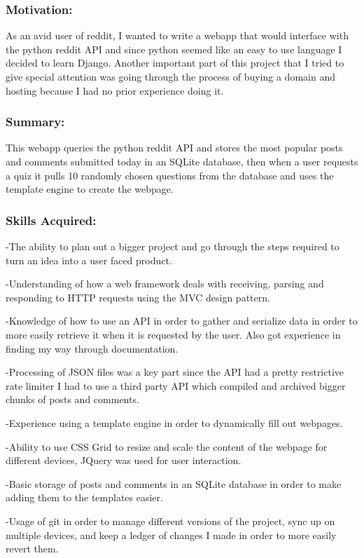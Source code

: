 \documentclass[a4paper,hidelinks,12pt]{article}
\begin{document}
\subsubsection{Motivation:}
As an avid user of reddit, I wanted to write a webapp that would interface with the python reddit API and
since python seemed like an easy to use language I decided to learn Django. Another important part of this
project that I tried to give special attention was going through the process of buying a domain and hosting
because I had no prior experience doing it.

\subsubsection{Summary:}
This webapp queries the python reddit API and stores the most popular posts and comments submitted today 
in an SQLite database, then when a user requests a quiz it pulls 10 randomly chosen questions from the
database and uses the template engine to create the webpage.
\subsubsection{Skills Acquired:}

-The ability to plan out a bigger project and go through the steps required to turn an idea into a user faced
product.

-Understanding of how a web framework deals with receiving, parsing and responding to HTTP requests using
the MVC design pattern.

-Knowledge of how to use an API in order to gather and serialize data in order to more easily retrieve it
when it is requested by the user. Also got experience in finding my way through documentation.

-Processing of JSON files was a key part since the API had a pretty restrictive rate limiter I had to use a
third party API which compiled and archived bigger chunks of posts and comments.

-Experience using a template engine in order to dynamically fill out webpages.

-Ability to use CSS Grid to resize and scale the content of the webpage for different devices, JQuery was used
for user interaction.

-Basic storage of posts and comments in an SQLite database in order to make adding them to the templates easier.

-Usage of git in order to manage different versions of the project, sync up on multiple devices, and keep a
ledger of changes I made in order to more easily revert them.
\end{document}
